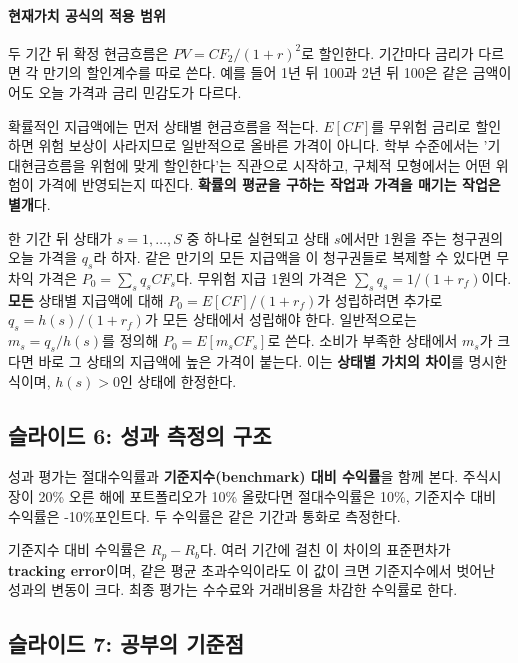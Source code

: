 \documentclass[11pt,a4paper]{article}
\begin{document}
\paragraph{현재가치 공식의 적용 범위}

두 기간 뒤 확정 현금흐름은 $PV=CF_2/(1+r)^2$로 할인한다. 기간마다 금리가 다르면 각 만기의 할인계수를 따로 쓴다. 예를 들어 1년 뒤 100과 2년 뒤 100은 같은 금액이어도 오늘 가격과 금리 민감도가 다르다.
\par

확률적인 지급액에는 먼저 상태별 현금흐름을 적는다. $E[CF]$를 무위험 금리로 할인하면 위험 보상이 사라지므로 일반적으로 올바른 가격이 아니다. 학부 수준에서는 '기대현금흐름을 위험에 맞게 할인한다'는 직관으로 시작하고, 구체적 모형에서는 어떤 위험이 가격에 반영되는지 따진다. \textbf{확률의 평균을 구하는 작업과 가격을 매기는 작업은 별개}다.
\par

한 기간 뒤 상태가 $s=1,\ldots,S$ 중 하나로 실현되고 상태 $s$에서만 1원을 주는 청구권의 오늘 가격을 $q_s$라 하자. 같은 만기의 모든 지급액을 이 청구권들로 복제할 수 있다면 무차익 가격은 $P_0=\sum_s q_sCF_s$다. 무위험 지급 1원의 가격은 $\sum_s q_s=1/(1+r_f)$이다. \textbf{모든} 상태별 지급액에 대해 $P_0=E[CF]/(1+r_f)$가 성립하려면 추가로 $q_s=h(s)/(1+r_f)$가 모든 상태에서 성립해야 한다. 일반적으로는 $m_s=q_s/h(s)$를 정의해 $P_0=E[m_sCF_s]$로 쓴다. 소비가 부족한 상태에서 $m_s$가 크다면 바로 그 상태의 지급액에 높은 가격이 붙는다. 이는 \textbf{상태별 가치의 차이}를 명시한 식이며, $h(s)>0$인 상태에 한정한다.
\par

\subsection{슬라이드 6: 성과 측정의 구조}

성과 평가는 절대수익률과 \textbf{기준지수(benchmark) 대비 수익률}을 함께 본다. 주식시장이 20\% 오른 해에 포트폴리오가 10\% 올랐다면 절대수익률은 10\%, 기준지수 대비 수익률은 -10\%포인트다. 두 수익률은 같은 기간과 통화로 측정한다.
\par

기준지수 대비 수익률은 $R_p-R_b$다. 여러 기간에 걸친 이 차이의 표준편차가 \textbf{tracking error}이며, 같은 평균 초과수익이라도 이 값이 크면 기준지수에서 벗어난 성과의 변동이 크다. 최종 평가는 수수료와 거래비용을 차감한 수익률로 한다.
\par

\subsection{슬라이드 7: 공부의 기준점}
\end{document}
